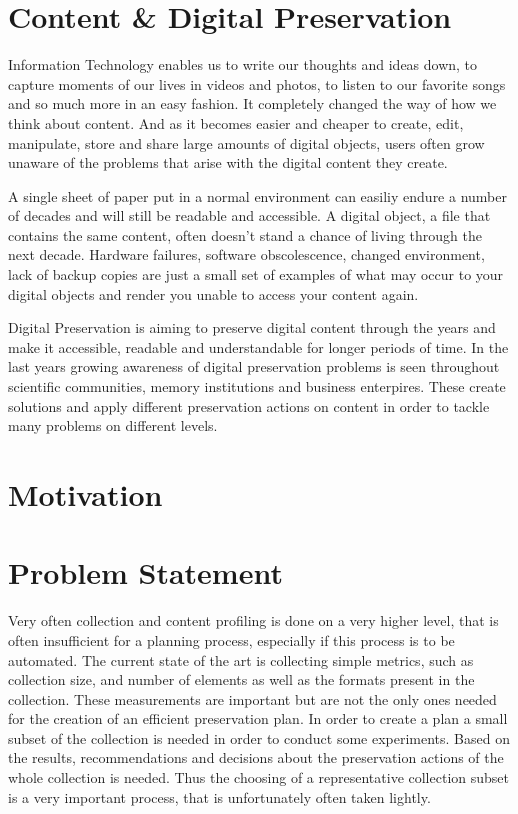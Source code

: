 \section{Content \& Digital Preservation}
Information Technology enables us to write our thoughts and ideas down, to capture moments of our lives in videos and photos, to listen to our favorite songs and so much more in an easy fashion. It completely changed the way of how we think about content. And as it becomes easier and cheaper to create, edit, manipulate, store and share large amounts of digital objects, users often grow unaware of the problems that arise with the digital content they create.

A single sheet of paper put in a normal environment can easiliy endure a number of decades and will still be readable and accessible. A digital object, a file that contains the same content, often doesn't stand a chance of living through the next decade. Hardware failures, software obscolescence, changed environment, lack of backup copies are just a small set of examples of what may occur to your digital objects and render you unable to access your content again.

Digital Preservation is aiming to preserve digital content through the years and make it accessible, readable and understandable for longer periods of time. In the last years growing awareness of digital preservation problems is seen throughout scientific communities, memory institutions and business enterpires. These create solutions and apply different preservation actions on content in order to tackle many problems on different levels.

\section{Motivation}
\section{Problem Statement}
Very often collection and content profiling is done on a very higher level, that
is often insufficient for a planning process, especially if this process is to be automated.
The current state of the art is collecting simple metrics, such as collection size, and number of elements as well as the formats present in the collection. These measurements are important but are not the only ones needed for the creation of an efficient preservation plan.
In order to create a plan a small subset of the collection is needed in order to conduct some experiments. Based on the results, recommendations and decisions about the preservation actions of the whole collection is needed. Thus the choosing of a representative collection subset is a very important process, that is unfortunately often taken lightly.

